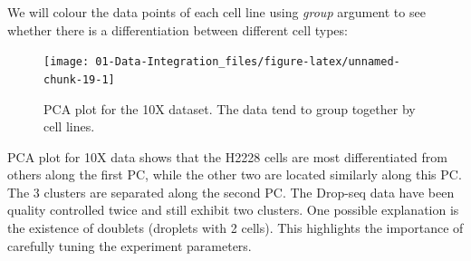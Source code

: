 \documentclass[]{book}
\newenvironment{Shaded}{\begin{snugshade}}{\end{snugshade}}
\newcommand{\CommentTok}[1]{\textcolor[rgb]{0.56,0.35,0.01}{\textit{#1}}}
\newcommand{\DataTypeTok}[1]{\textcolor[rgb]{0.13,0.29,0.53}{#1}}
\newcommand{\DecValTok}[1]{\textcolor[rgb]{0.00,0.00,0.81}{#1}}
\newcommand{\FloatTok}[1]{\textcolor[rgb]{0.00,0.00,0.81}{#1}}
\newcommand{\KeywordTok}[1]{\textcolor[rgb]{0.13,0.29,0.53}{\textbf{#1}}}
\newcommand{\NormalTok}[1]{#1}
\newcommand{\OperatorTok}[1]{\textcolor[rgb]{0.81,0.36,0.00}{\textbf{#1}}}
\newcommand{\StringTok}[1]{\textcolor[rgb]{0.31,0.60,0.02}{#1}}
\theoremstyle{definition}
\theoremstyle{definition}
\theoremstyle{definition}
\theoremstyle{remark}
\begin{document}
We will colour the data points of each cell line using \emph{group}
argument to see whether there is a differentiation between different
cell types:

\begin{Shaded}
\end{Shaded}

\begin{Shaded}
\end{Shaded}

\begin{figure}[ht]

{\centering \texttt{[image: 01-Data-Integration\_files/figure-latex/unnamed-chunk-19-1]} 

}

\caption{PCA plot for the 10X dataset. The data tend to group together by cell lines.}\label{fig:unnamed-chunk-19}
\end{figure}

PCA plot for 10X data shows that the H2228 cells are most differentiated
from others along the first PC, while the other two are located
similarly along this PC. The 3 clusters are separated along the second
PC. The Drop-seq data have been quality controlled twice and still
exhibit two clusters. One possible explanation is the existence of
doublets (droplets with 2 cells). This highlights the importance of
carefully tuning the experiment parameters.
\end{document}
